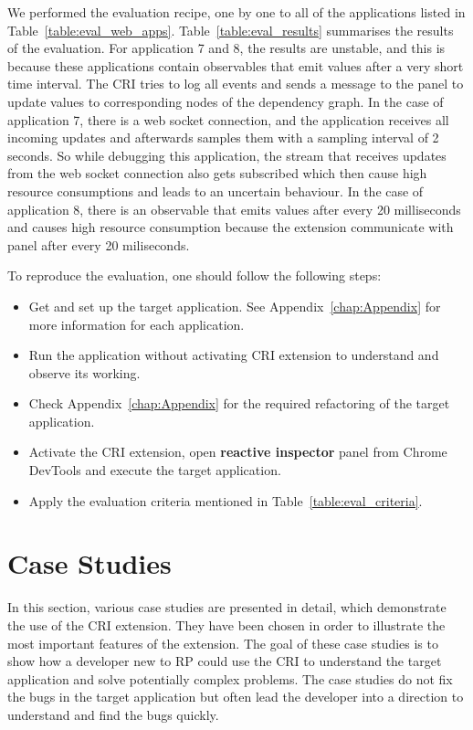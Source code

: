 We performed the evaluation recipe, one by one to all of the applications listed in Table~\ref{table:eval_web_apps}.  Table~\ref{table:eval_results} summarises the results of the evaluation. 
For application 7 and 8, the results are unstable, and this is because these applications contain observables that emit values after a very short time interval. The CRI tries to log all events and sends a message to the panel to update values to corresponding nodes of the dependency graph. 
In the case of application 7, there is a web socket connection, and the application receives all incoming updates and afterwards samples them with a sampling interval of 2 seconds. So while debugging this application, the stream that receives updates from the web socket connection also gets subscribed which then cause high resource consumptions and leads to an uncertain behaviour.
In the case of application 8, there is an observable that emits values after every 20 milliseconds and causes high resource consumption because the extension communicate with panel after every 20 miliseconds. 

To reproduce the evaluation, one should follow the following steps:

\begin{itemize}
	\item Get and set up the target application. See Appendix~\ref{chap:Appendix} for more information for each application.
	
	\item Run the application without activating CRI extension to understand and observe its working.
	
	\item Check Appendix~\ref{chap:Appendix} for the required refactoring of the target application.
	
	\item Activate the CRI extension, open \textbf{reactive inspector} panel from Chrome DevTools and execute the target application.
	
	\item Apply the evaluation criteria mentioned in Table~\ref{table:eval_criteria}.
		
	
\end{itemize}

\section{Case Studies}
In this section, various case studies are presented in detail, which demonstrate the use of the CRI extension. They have been chosen in order to illustrate the most important features of the extension. The goal of these case studies is to show how a developer new to RP could use  the CRI to understand the target application and solve potentially complex problems. The case studies do not fix the bugs in the target application but often lead the developer into a direction to understand and find the bugs quickly.



